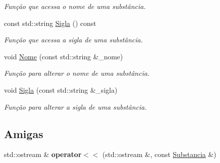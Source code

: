 \begin{DoxyCompactItemize}
\begin{DoxyCompactList}\small\item\em Função que acessa o nome de uma substância. \end{DoxyCompactList}\item 
\hypertarget{class_substancia_aa9cb76501b911084a2ed1c9413963506}{const std\+::string \hyperlink{class_substancia_aa9cb76501b911084a2ed1c9413963506}{Sigla} () const }\label{class_substancia_aa9cb76501b911084a2ed1c9413963506}

\begin{DoxyCompactList}\small\item\em Função que acessa a sigla de uma substância. \end{DoxyCompactList}\item 
\hypertarget{class_substancia_a715c6670b8fe76dabf6820706b1202b3}{void \hyperlink{class_substancia_a715c6670b8fe76dabf6820706b1202b3}{Nome} (const std\+::string \&\+\_\+nome)}\label{class_substancia_a715c6670b8fe76dabf6820706b1202b3}

\begin{DoxyCompactList}\small\item\em Função para alterar o nome de uma substância. \end{DoxyCompactList}\item 
\hypertarget{class_substancia_a69b92b1d9ee7d2b5acd9c336d04247bf}{void \hyperlink{class_substancia_a69b92b1d9ee7d2b5acd9c336d04247bf}{Sigla} (const std\+::string \&\+\_\+sigla)}\label{class_substancia_a69b92b1d9ee7d2b5acd9c336d04247bf}

\begin{DoxyCompactList}\small\item\em Função para alterar a sigla de uma substância. \end{DoxyCompactList}\end{DoxyCompactItemize}
\subsection*{Amigas}
\begin{DoxyCompactItemize}
\item 
\hypertarget{class_substancia_a3b2605b58b70a3b377b0b3e271f291c9}{std\+::ostream \& {\bfseries operator$<$$<$} (std\+::ostream \&, const \hyperlink{class_substancia}{Substancia} \&)}\label{class_substancia_a3b2605b58b70a3b377b0b3e271f291c9}

\end{DoxyCompactItemize}


